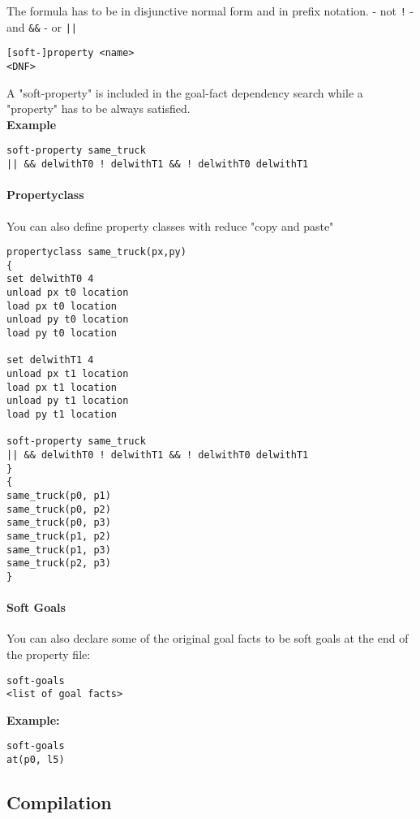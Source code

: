 \documentclass{article}
\begin{document}
The formula has to be in disjunctive normal form and in prefix notation.
- not \texttt{!}
- and \texttt{\&\&}
- or \texttt{||}

\begin{lstlisting}
[soft-]property <name>
<DNF>
\end{lstlisting}

A "soft-property" is included in the goal-fact dependency search while a "property" 
has to be always satisfied.\\

\noindent
\textbf{Example}


\begin{lstlisting}
soft-property same_truck
|| && delwithT0 ! delwithT1 && ! delwithT0 delwithT1
\end{lstlisting}


\paragraph{Propertyclass}
You can also define property classes with reduce "copy and paste"

\begin{lstlisting}
propertyclass same_truck(px,py)
{
set delwithT0 4
unload px t0 location
load px t0 location
unload py t0 location
load py t0 location

set delwithT1 4
unload px t1 location
load px t1 location
unload py t1 location
load py t1 location

soft-property same_truck
|| && delwithT0 ! delwithT1 && ! delwithT0 delwithT1
}
{
same_truck(p0, p1)
same_truck(p0, p2)
same_truck(p0, p3)
same_truck(p1, p2)
same_truck(p1, p3)
same_truck(p2, p3)
}
\end{lstlisting}


\paragraph{Soft Goals}
You can also declare some of the original goal facts to be soft goals at the end of the property file:

\begin{lstlisting}
soft-goals
<list of goal facts>
\end{lstlisting}

\noindent
\textbf{Example:}

\begin{lstlisting}
soft-goals
at(p0, l5)
\end{lstlisting}

\subsection{Compilation}
\end{document}
